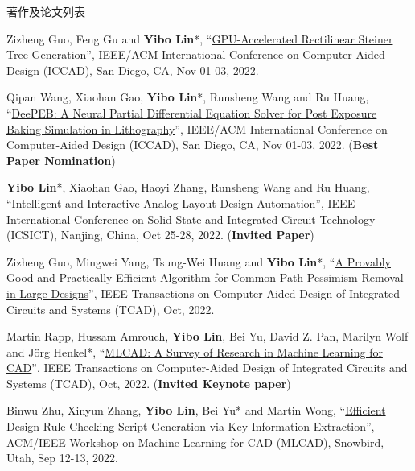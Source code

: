 \begin{rSection}{著作及论文列表}
\begin{description}[font=\normalfont, rightmargin=2em]
\item[{[C104]}]{
        Zizheng Guo, Feng Gu and \textbf{Yibo Lin}*, 
    ``\href{https://doi.org/10.1145/3508352.3549434}{GPU-Accelerated Rectilinear Steiner Tree Generation}'', 
    IEEE/ACM International Conference on Computer-Aided Design (ICCAD), San Diego, CA, Nov 01-03, 2022.
    
}
            

\item[{[C103]}]{
        Qipan Wang, Xiaohan Gao, \textbf{Yibo Lin}*, Runsheng Wang and Ru Huang, 
    ``\href{https://doi.org/10.1145/3508352.3549398}{DeePEB: A Neural Partial Differential Equation Solver for Post Exposure Baking Simulation in Lithography}'', 
    IEEE/ACM International Conference on Computer-Aided Design (ICCAD), San Diego, CA, Nov 01-03, 2022.
    (\textbf{Best Paper Nomination})
}
            

\item[{[C102]}]{
        \textbf{Yibo Lin}*, Xiaohan Gao, Haoyi Zhang, Runsheng Wang and Ru Huang, 
    ``\href{https://doi.org/10.1109/ICSICT55466.2022.9963217}{Intelligent and Interactive Analog Layout Design Automation}'', 
    IEEE International Conference on Solid-State and Integrated Circuit Technology (ICSICT), Nanjing, China, Oct 25-28, 2022.
    (\textbf{Invited Paper})
}
            

\item[{[J101]}]{
        Zizheng Guo, Mingwei Yang, Tsung-Wei Huang and \textbf{Yibo Lin}*, 
    ``\href{https://doi.org/10.1109/TCAD.2021.3124758}{A Provably Good and Practically Efficient Algorithm for Common Path Pessimism Removal in Large Designs}'', 
    IEEE Transactions on Computer-Aided Design of Integrated Circuits and Systems (TCAD), Oct, 2022.
    
}
            

\item[{[J100]}]{
        Martin Rapp, Hussam Amrouch, \textbf{Yibo Lin}, Bei Yu, David Z. Pan, Marilyn Wolf and Jörg Henkel*, 
    ``\href{https://doi.org/10.1109/TCAD.2021.3124762}{MLCAD: A Survey of Research in Machine Learning for CAD}'', 
    IEEE Transactions on Computer-Aided Design of Integrated Circuits and Systems (TCAD), Oct, 2022.
    (\textbf{Invited Keynote paper})
}
            

\item[{[C99]}]{
        Binwu Zhu, Xinyun Zhang, \textbf{Yibo Lin}, Bei Yu* and Martin Wong, 
    ``\href{https://doi.org/10.1145/3551901.3556494}{Efficient Design Rule Checking Script Generation via Key Information Extraction}'', 
    ACM/IEEE Workshop on Machine Learning for CAD (MLCAD), Snowbird, Utah, Sep 12-13, 2022.
    
}
\end{description}
\end{rSection}
